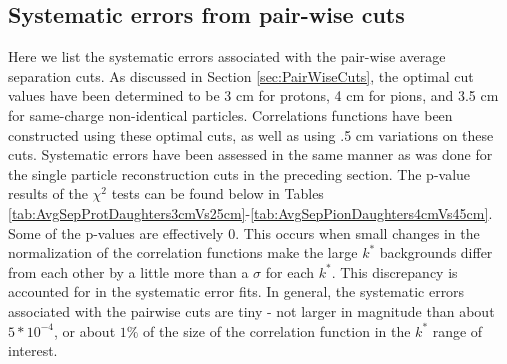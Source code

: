 \subsection{Systematic errors from pair-wise cuts}
\label{sec:SystematicsPairWise}

Here we list the systematic errors associated with the pair-wise average separation cuts.  As discussed in Section \ref{sec:PairWiseCuts}, the optimal cut values have been determined to be 3 cm for protons, 4 cm for pions, and 3.5 cm for same-charge non-identical particles.  Correlations functions have been constructed using these optimal cuts, as well as using .5 cm variations on these cuts.  Systematic errors have been assessed in the same manner as was done for the single particle reconstruction cuts in the preceding section.  The p-value results of the $\chi^2$ tests can be found below in Tables \ref{tab:AvgSepProtDaughters3cmVs25cm}-\ref{tab:AvgSepPionDaughters4cmVs45cm}.  Some of the p-values are effectively 0.  This occurs when small changes in the normalization of the correlation functions make the large $k^*$ backgrounds differ from each other by a little more than a $\sigma$ for each $k^*$.  This discrepancy is accounted for in the systematic error fits.  In general, the systematic errors associated with the pairwise cuts are tiny - not larger in magnitude than about $5*10^{-4}$, or about $1\%$ of the size of the correlation function in the $k^*$ range of interest.  

